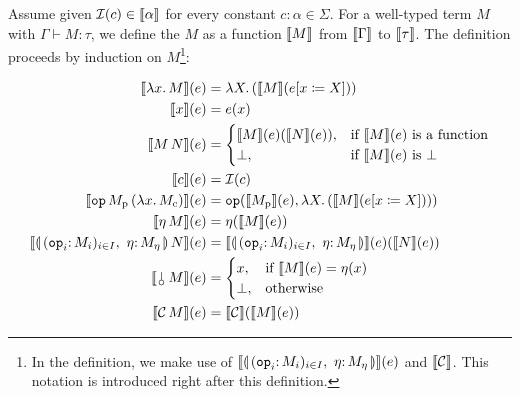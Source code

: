 \begin{definition}
  Assume given $\mathcal{I}(c) \in \llbracket \alpha \rrbracket$ for every constant
  $c : \alpha \in \Sigma$. For a well-typed term $M$ with
  $\Gamma \vdash M : \tau$, we define the 
  $M$ as a function $\llbracket M \rrbracket$ from $\llbracket \Gamma \rrbracket$ to $\llbracket \tau \rrbracket$. The
  definition proceeds by induction on $M$\footnote{In the definition, we
    make use of $\sem{\cibanana}(e)$ and $\llbracket \mathcal{C} \rrbracket$. This notation is
    introduced right after this definition.}:
  
  \begin{align*}
    \sem{\lam{x}{M}}(e) &= \lam{X}{(\sem{M}(\subst{e}{x}{X}))} \\
    \sem{x}(e) &= e(x) \\
    \sem{\ap{M}{N}}(e) &= \begin{cases}
      \sem{M}(e)(\sem{N}(e)),& \text{if $\sem{M}(e)$ is a function} \\
      \bot, & \text{if $\sem{M}(e)$ is $\bot$}
    \end{cases} \\
    \sem{c}(e) &= \II(c) \\
    \sem{\app{\op{op}}{M_\petitp}{(\lam{x}{M_\petitc})}}(e) &=
      \op{op}(\sem{M_\petitp}(e), \lam{X}{(\sem{M}({\subst{e}{x}{X}}))}) \\
    \sem{\etaE{M}}(e) &= \eta(\sem{M}(e)) \\
    \sem{\ap{\cibanana}{N}}(e) &= \sem{\cibanana}(e)(\sem{N}(e)) \\
    \sem{\ap{\cherry}{M}}(e) &= \begin{cases}
      x, & \text{if $\sem{M}(e) = \eta(x)$} \\
      \bot, & \text{otherwise} \\
    \end{cases} \\
    \sem{\ap{\CC}{M}}(e) &= \sem{\CC}(\sem{M}(e))
  \end{align*}
\end{definition}

